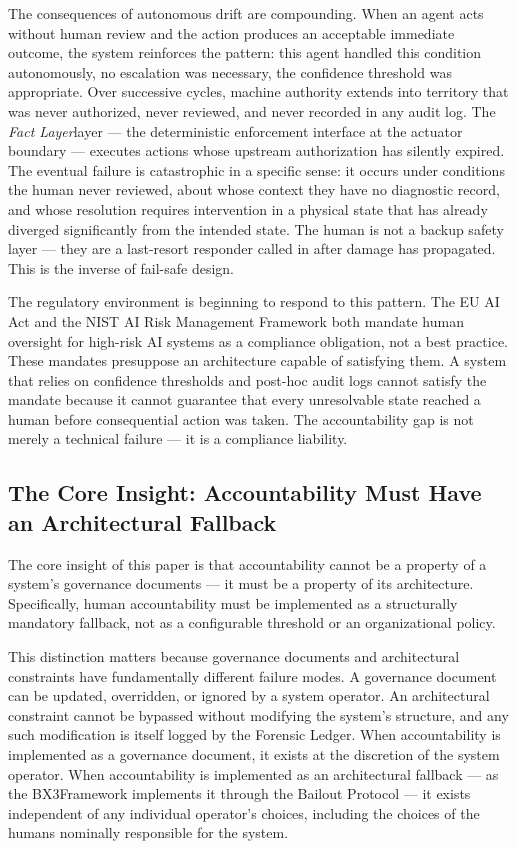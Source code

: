 \documentclass[12pt]{article}
\newcommand{\bxthree}{\mbox{BX3}}
\newcommand{\fact}{\textit{Fact Layer}}
\begin{document}
The consequences of autonomous drift are compounding. When an agent acts without human review and the action produces an acceptable immediate outcome, the system reinforces the pattern: this agent handled this condition autonomously, no escalation was necessary, the confidence threshold was appropriate. Over successive cycles, machine authority extends into territory that was never authorized, never reviewed, and never recorded in any audit log. The \fact layer — the deterministic enforcement interface at the actuator boundary — executes actions whose upstream authorization has silently expired. The eventual failure is catastrophic in a specific sense: it occurs under conditions the human never reviewed, about whose context they have no diagnostic record, and whose resolution requires intervention in a physical state that has already diverged significantly from the intended state. The human is not a backup safety layer — they are a last-resort responder called in after damage has propagated. This is the inverse of fail-safe design.

The regulatory environment is beginning to respond to this pattern. The EU AI Act and the NIST AI Risk Management Framework both mandate human oversight for high-risk AI systems as a compliance obligation, not a best practice. These mandates presuppose an architecture capable of satisfying them. A system that relies on confidence thresholds and post-hoc audit logs cannot satisfy the mandate because it cannot guarantee that every unresolvable state reached a human before consequential action was taken. The accountability gap is not merely a technical failure — it is a compliance liability.

\subsection{The Core Insight: Accountability Must Have an Architectural Fallback}

The core insight of this paper is that accountability cannot be a property of a system's governance documents — it must be a property of its architecture. Specifically, human accountability must be implemented as a structurally mandatory fallback, not as a configurable threshold or an organizational policy.

This distinction matters because governance documents and architectural constraints have fundamentally different failure modes. A governance document can be updated, overridden, or ignored by a system operator. An architectural constraint cannot be bypassed without modifying the system's structure, and any such modification is itself logged by the Forensic Ledger. When accountability is implemented as a governance document, it exists at the discretion of the system operator. When accountability is implemented as an architectural fallback — as the \bxthree Framework implements it through the Bailout Protocol — it exists independent of any individual operator's choices, including the choices of the humans nominally responsible for the system.
\end{document}
